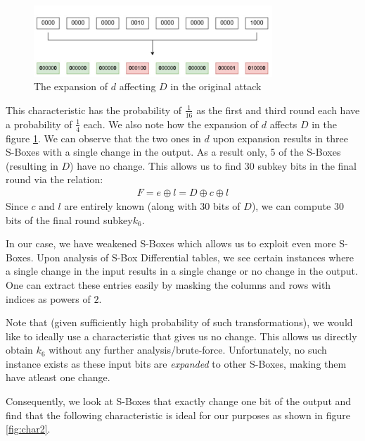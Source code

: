 \documentclass[12pt]{article}
\begin{document}
\begin{figure}[!h]
  \centering
  \includegraphics[width=0.8\textwidth]{char1_exp.png}
  \caption{The expansion of $d$ affecting $D$ in the original attack}
\label{fig:exp1}
\end{figure}

This characteristic has the probability of $\frac{1}{16}$ as the first and third round each have a probability of $\frac{1}{4}$ each. We also note how the expansion of $d$ affects $D$ in the figure \ref{fig:exp1}. We can observe that the two ones in $d$ upon expansion results in three S-Boxes with a single change in the output. As a result only, $5$ of the S-Boxes (resulting in $D$) have no change. This allows us to find $30$ subkey bits in the final round via the relation:
\begin{align*}
  F = e \oplus l = D \oplus c \oplus l
\end{align*}
Since $c$ and $l$ are entirely known (along with $30$ bits of $D$), we can compute $30$ bits of the final round subkey$k_6$.

In our case, we have weakened S-Boxes which allows us to exploit even more S-Boxes. Upon analysis of S-Box Differential tables, we see certain instances where a single change in the input results in a single change or no change in the output. One can extract these entries easily by masking the columns and rows with indices as powers of $2$.

Note that (given sufficiently high probability of such transformations), we would like to ideally use a characteristic that gives us no change. This allows us directly obtain $k_6$ without any further analysis/brute-force. Unfortunately, no such instance exists as these input bits are \emph{expanded} to other S-Boxes, making them have atleast one change.

Consequently, we look at S-Boxes that exactly change one bit of the output and find that the following characteristic is ideal for our purposes as shown in figure \ref{fig:char2}.
\end{document}
